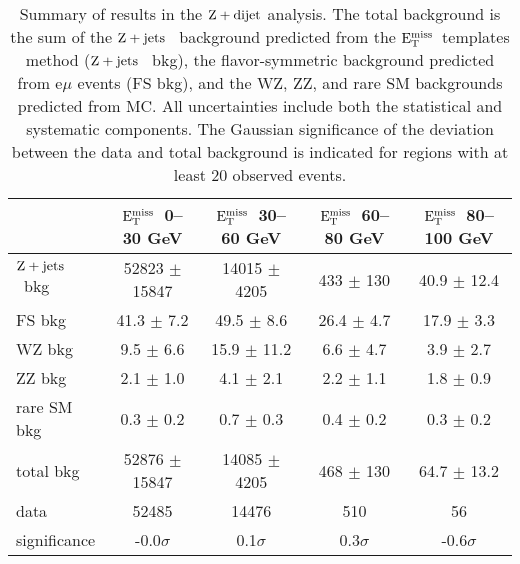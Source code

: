 \newcommand{\zjets}{$\rm{Z}+\rm{jets}$ }
\newcommand{\MET}{\ensuremath{\rm{E_{T}^{miss}}}}



\begin{table}[htb]
\begin{center}
\footnotesize
\caption{\label{tab:results_targ}\footnotesize Summary of results in the $\rm{Z}+\rm{dijet}$ analysis. The total background is the sum of the \zjets\ background predicted from
the \MET\ templates method (\zjets\ bkg), the flavor-symmetric background predicted from e$\mu$ events (FS bkg), and the WZ, ZZ, and rare SM backgrounds predicted from MC.
All uncertainties include both the statistical and systematic components. The Gaussian significance of the deviation between the data 
and total background is indicated for regions with at least 20 observed events. }
\begin{tabular}{l|c|c|c|c}

\hline
\hline

                      &   \MET\ 0--30 GeV   &  \MET\ 30--60 GeV   &  \MET\ 60--80 GeV   & \MET\ 80--100 GeV   \\
\hline
        \zjets\ bkg   & 52823 $\pm$ 15847   &  14015 $\pm$ 4205   &     433 $\pm$ 130   &   40.9 $\pm$ 12.4   \\
             FS bkg   &    41.3 $\pm$ 7.2   &    49.5 $\pm$ 8.6   &    26.4 $\pm$ 4.7   &    17.9 $\pm$ 3.3   \\
             WZ bkg   &     9.5 $\pm$ 6.6   &   15.9 $\pm$ 11.2   &     6.6 $\pm$ 4.7   &     3.9 $\pm$ 2.7   \\
             ZZ bkg   &     2.1 $\pm$ 1.0   &     4.1 $\pm$ 2.1   &     2.2 $\pm$ 1.1   &     1.8 $\pm$ 0.9   \\
        rare SM bkg   &     0.3 $\pm$ 0.2   &     0.7 $\pm$ 0.3   &     0.4 $\pm$ 0.2   &     0.3 $\pm$ 0.2   \\
\hline
          total bkg   & 52876 $\pm$ 15847   &  14085 $\pm$ 4205   &     468 $\pm$ 130   &   64.7 $\pm$ 13.2   \\
               data   &             52485   &             14476   &               510   &                56   \\
       significance   &      -0.0$\sigma$   &       0.1$\sigma$   &       0.3$\sigma$   &      -0.6$\sigma$   \\



\end{tabular}
\end{center}
\end{table}
